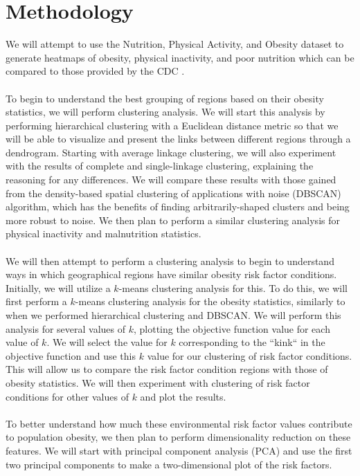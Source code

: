 \documentclass{article}
\begin{document}
\section{Methodology}
\label{methodology}
We will attempt to use the Nutrition, Physical Activity, and Obesity dataset to generate heatmaps of obesity, physical inactivity, and poor nutrition which can be compared to those provided by the CDC \cite{adultobesitymaps}. 
\\\\
To begin to understand the best grouping of regions based on their obesity statistics, we will perform clustering analysis.
We will start this analysis by performing hierarchical clustering with a Euclidean distance metric so that we will be able to visualize and present the links between different regions through a dendrogram. 
Starting with average linkage clustering, we will also experiment with the results of complete and single-linkage clustering, explaining the reasoning for any differences.
We will compare these results with those gained from the density-based spatial clustering of applications with noise (DBSCAN) algorithm, which has the benefits of finding arbitrarily-shaped clusters and being more robust to noise. 
We then plan to perform a similar clustering analysis for physical inactivity and malnutrition statistics.
\\\\
We will then attempt to perform a clustering analysis to begin to understand ways in which geographical regions have similar obesity risk factor conditions.
Initially, we will utilize a $k$-means clustering analysis for this. To do this, we will first perform a $k$-means clustering analysis for the obesity statistics, similarly to when we performed hierarchical clustering and DBSCAN. 
We will perform this analysis for several values of $k$, plotting the objective function value for each value of $k$. We will select the value for $k$ corresponding to the ``kink`` in the objective function and use this $k$ value for our clustering of risk factor conditions. This will allow us to compare the risk factor condition regions with those of obesity statistics. We will then experiment with clustering of risk factor conditions for other values of $k$ and plot the results.
\\\\
To better understand how much these environmental risk factor values contribute to population obesity, we then plan to perform dimensionality reduction on these features. We will start with principal component analysis (PCA) and use the first two principal components to make a two-dimensional plot of the risk factors.
\end{document}
